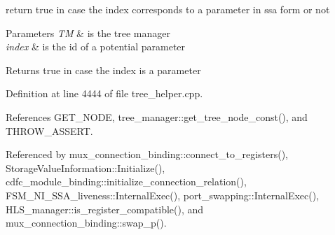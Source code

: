 return true in case the index corresponds to a parameter in ssa form or not 


\begin{DoxyParams}{Parameters}
{\em TM} & is the tree manager \\
\hline
{\em index} & is the id of a potential parameter \\
\hline
\end{DoxyParams}
\begin{DoxyReturn}{Returns}
true in case the index is a parameter 
\end{DoxyReturn}


Definition at line 4444 of file tree\+\_\+helper.\+cpp.



References G\+E\+T\+\_\+\+N\+O\+DE, tree\+\_\+manager\+::get\+\_\+tree\+\_\+node\+\_\+const(), and T\+H\+R\+O\+W\+\_\+\+A\+S\+S\+E\+RT.



Referenced by mux\+\_\+connection\+\_\+binding\+::connect\+\_\+to\+\_\+registers(), Storage\+Value\+Information\+::\+Initialize(), cdfc\+\_\+module\+\_\+binding\+::initialize\+\_\+connection\+\_\+relation(), F\+S\+M\+\_\+\+N\+I\+\_\+\+S\+S\+A\+\_\+liveness\+::\+Internal\+Exec(), port\+\_\+swapping\+::\+Internal\+Exec(), H\+L\+S\+\_\+manager\+::is\+\_\+register\+\_\+compatible(), and mux\+\_\+connection\+\_\+binding\+::swap\+\_\+p().

